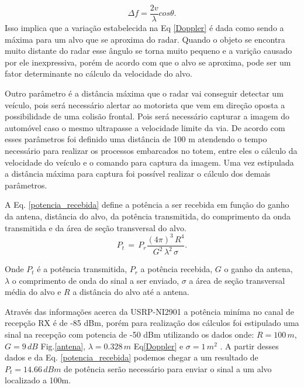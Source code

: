  \begin{equation}\label{Doppler2} 
  \Delta f =  \frac{2v}{\lambda}cos \theta.
\end{equation}
Isso implica que a variação estabelecida na Eq \ref{Doppler} é dada como sendo a máxima para um alvo que se aproxima do radar. Quando o objeto se encontra muito distante do radar esse ângulo se torna muito pequeno e a varição causado por ele inexpressiva, porém de acordo com que o alvo se aproxima, pode ser um fator determinante no cálculo da velocidade do alvo.

Outro parâmetro é a distância máxima que o radar vai conseguir detectar um veículo, pois será necessário alertar ao motorista que vem em direção oposta a possibilidade de uma colisão frontal. Pois será necessário capturar a imagem do automóvel caso o mesmo ultrapasse a velocidade limite da via. De acordo com esses parâmetros foi definido uma distância de 100 m atendendo o tempo necessário para realizar os processos embarcados no totem, entre eles o cálculo da velocidade do veículo e o comando para captura da imagem. Uma vez estipulada a distância máxima para captura foi possível realizar o cálculo dos demais parâmetros.

A Eq. \ref{potencia_recebida} define a potência a ser recebida em função do ganho da antena, distância do alvo, da potência transmitida, do comprimento da onda transmitida e da área de seção transversal do alvo\cite{Richards}.
\begin{equation}\label{potencia_recebida}
    P_t\, =\,   P_r \frac{(4\pi)^{3}\,  R^{4}}{G^{2}\,   \lambda^{2}\, \sigma }.
\end{equation}%

Onde $P_t$ é a potência transmitida, $P_r$ a potência recebida, $G$ o ganho da antena, $\lambda$ o comprimento de onda do sinal a ser enviado, $\sigma$ a área de seção transversal média do alvo e $R$ a distância do alvo até a antena.

Através das informações acerca da USRP-NI2901 \cite{rds}  a potência miníma no canal de recepção RX é de -85 dBm, porém para realização dos cálculos foi estipulado uma sinal na recepção com potencia de -50 dBm utilizando os dados onde: $R=100 \, m$, $G=9 \, dB$ Fig.\ref{antena}, $\lambda=0.328 \, m$ Eq\ref{Doppler} e $\sigma=1 \, m^{2}$ \cite{Richards}. A partir desses dados e da Eq. \ref{potencia_recebida} podemos chegar a um resultado de $P_t=14.66 \, dBm$ de potência serão necessário para enviar o sinal a um alvo localizado a 100m.

